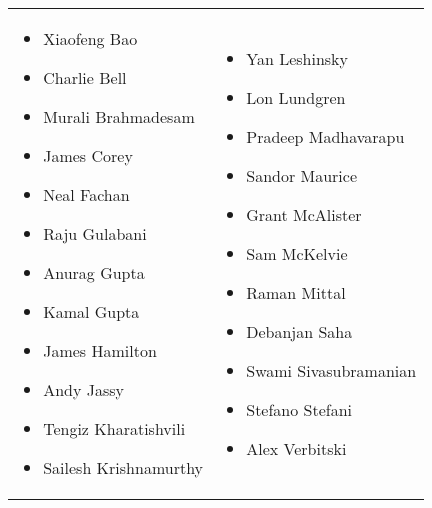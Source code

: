 \begin{tabular}{l l}
\begin{minipage} [t] {0.38\textwidth} 
\begin{itemize}
\setlength\itemsep{-3pt}
\item Xiaofeng Bao
\item Charlie Bell
\item Murali Brahmadesam
\item James Corey
\item Neal Fachan
\item Raju Gulabani
\item Anurag Gupta
\item Kamal Gupta
\item James Hamilton
\item Andy Jassy
\item Tengiz Kharatishvili
\item Sailesh Krishnamurthy

\end{itemize}
\end{minipage}
  & 
\begin{minipage} [t] {0.45\textwidth} 
\begin{itemize}
\setlength\itemsep{-3pt}
\item Yan Leshinsky
\item Lon Lundgren
\item Pradeep Madhavarapu
\item Sandor Maurice
\item Grant McAlister
\item Sam McKelvie
\item Raman Mittal
\item Debanjan Saha
\item Swami Sivasubramanian
\item Stefano Stefani
\item Alex Verbitski
\end{itemize}
\end{minipage}
\end{tabular}







